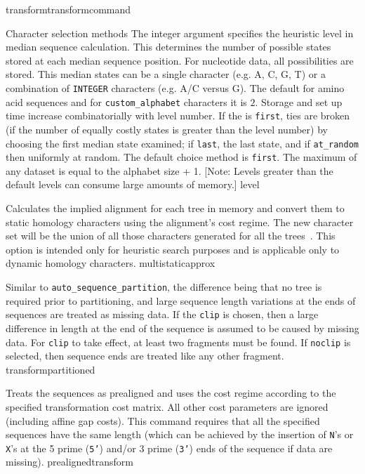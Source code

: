 \begin{command}{transform}{transformcommand}
\begin{arguments}
\begin{argumentgroup}{Character selection methods}
{The integer argument specifies the heuristic level in median sequence calculation. 
This determines the number of possible states stored at each median sequence position. 
For nucleotide data, all possibilities are stored. This median states can be a single character 
(e.g. A, C, G, T) or a combination of \texttt{INTEGER} characters (e.g. A/C versus G).
The default for amino acid sequences and for \texttt{custom\_alphabet} characters 
it is $2$. Storage and set up time increase combinatorially with level number. 
If the \poylident is \texttt{first}, ties are broken (if the number of equally costly states 
is greater than the level number) by choosing the first median state examined; 
if \texttt{last}, the last state, and if \texttt{at\_random} then uniformly at random.
The default choice method is \texttt{first}. The maximum  of 
any dataset is equal to the alphabet size + 1. [Note: Levels greater than the default 
levels can consume large amounts of memory.] }
{level}

{Calculates the implied alignment for each tree in memory
and convert them to static homology characters using the alignment's
cost regime. The new character set will be the union of all those
characters generated for all the trees~\cite{wheeler1995a}. This option is intended only
for heuristic search purposes and is applicable only to dynamic homology characters.}
{multistaticapprox}

{Similar to \texttt{auto\_sequence\_partition}, the difference being that no tree is
required prior to partitioning, and large sequence length variations
at the ends of sequences are treated as missing data. If the \poylident \texttt{clip} 
is chosen, then a large difference in length at the end of the sequence is assumed to be caused by
missing data. For \texttt{clip} to take effect, at least two fragments must
be found. If \poylident \texttt{noclip} is selected, then sequence ends are treated like
any other fragment.}
{transformpartitioned}

{Treats the sequences as prealigned and uses the
cost regime according to the specified transformation cost
matrix. All other cost parameters are ignored (including affine
gap costs). This command requires that all the specified sequences 
have the same length (which can be achieved by the insertion of \texttt{N}'s 
or \texttt{X}'s at the 5 prime (\texttt{5'}) and/or 3 prime (\texttt{3'}) ends
of the sequence if data are missing).}
{prealignedtransform}


\end{argumentgroup}
\end{arguments}
\end{command}
